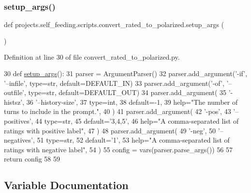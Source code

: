 \subsubsection{\texorpdfstring{setup\+\_\+args()}{setup\_args()}}
{\footnotesize\ttfamily def projects.\+self\+\_\+feeding.\+scripts.\+convert\+\_\+rated\+\_\+to\+\_\+polarized.\+setup\+\_\+args (\begin{DoxyParamCaption}{ }\end{DoxyParamCaption})}



Definition at line 30 of file convert\+\_\+rated\+\_\+to\+\_\+polarized.\+py.


\begin{DoxyCode}
30 \textcolor{keyword}{def }\hyperlink{namespaceprojects_1_1self__feeding_1_1scripts_1_1convert__rated__to__polarized_acba2c1088cdc95f703203c9166b9499d}{setup\_args}():
31     parser = ArgumentParser()
32     parser.add\_argument(\textcolor{stringliteral}{'-if'}, \textcolor{stringliteral}{'--infile'}, type=str, default=DEFAULT\_IN)
33     parser.add\_argument(\textcolor{stringliteral}{'-of'}, \textcolor{stringliteral}{'--outfile'}, type=str, default=DEFAULT\_OUT)
34     parser.add\_argument(
35         \textcolor{stringliteral}{'-histsz'},
36         \textcolor{stringliteral}{'--history-size'},
37         type=int,
38         default=-1,
39         help=\textcolor{stringliteral}{"The number of turns to include in the prompt."},
40     )
41     parser.add\_argument(
42         \textcolor{stringliteral}{'-pos'},
43         \textcolor{stringliteral}{'--positives'},
44         type=str,
45         default=\textcolor{stringliteral}{'3,4,5'},
46         help=\textcolor{stringliteral}{"A comma-separated list of ratings with positive label"},
47     )
48     parser.add\_argument(
49         \textcolor{stringliteral}{'-neg'},
50         \textcolor{stringliteral}{'--negatives'},
51         type=str,
52         default=\textcolor{stringliteral}{'1'},
53         help=\textcolor{stringliteral}{"A comma-separated list of ratings with negative label"},
54     )
55     config = vars(parser.parse\_args())
56 
57     \textcolor{keywordflow}{return} config
58 
59 
\end{DoxyCode}


\subsection{Variable Documentation}
\mbox{\label{namespaceprojects_1_1self__feeding_1_1scripts_1_1convert__rated__to__polarized_a6caf02831bff7f048ef8755cfa97c477}} 
